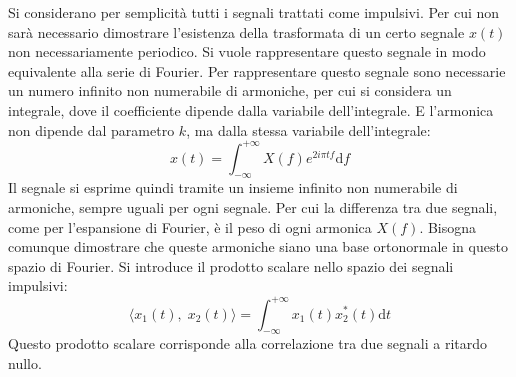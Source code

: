 \documentclass{article}
\newcommand{\df}{\mathrm{d}}
\numberwithin{equation}{subsection}
\begin{document}
Si considerano per semplicità tutti i segnali trattati come impulsivi. Per cui non sarà necessario dimostrare l'esistenza della trasformata di un certo segnale $x(t)$ 
non necessariamente periodico. Si vuole rappresentare questo segnale in modo equivalente alla serie di Fourier. Per rappresentare questo segnale sono necessarie un numero 
infinito non numerabile di armoniche, per cui si considera un integrale, dove il coefficiente dipende dalla variabile dell'integrale. E l'armonica non dipende dal parametro 
$k$, ma dalla stessa variabile dell'integrale:
\begin{equation}
    x(t)=\displaystyle\int_{-\infty}^{+\infty}X(f)e^{2i\pi tf}\df f
\end{equation}
Il segnale si esprime quindi tramite un insieme infinito non numerabile di armoniche, sempre uguali per ogni segnale. Per cui la differenza tra due segnali, come per 
l'espansione di Fourier, è il peso di ogni armonica $X(f)$. Bisogna comunque dimostrare che queste armoniche siano una base ortonormale in questo spazio di Fourier. Si 
introduce il prodotto scalare nello spazio dei segnali impulsivi:
\begin{equation*}
    \langle x_1(t),\;x_2(t)\rangle=\displaystyle\int_{-\infty}^{+\infty}x_1(t)x_2^*(t)\df t
\end{equation*}
Questo prodotto scalare corrisponde alla correlazione tra due segnali a ritardo nullo. 
\end{document}
